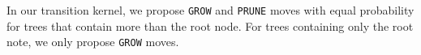 In our transition kernel, we propose \texttt{GROW} and \texttt{PRUNE} moves with equal probability for trees that contain more than the root node.
For trees containing only the root note, we only propose \texttt{GROW} moves.


\begin{comment}
\textbf{\texttt{GROW} transitions}. Suppose first that $T^{\star}$ is constructed from $T$ using a \texttt{GROW} move.
In order to construct $T^{\star},$ we must randomly select (i) a leaf node $\texttt{nx}$ in $T$ and (ii) a new decision rule $(v(\texttt{nx}), c(\texttt{nx})).$
In $T^{\star},$ the node $\texttt{nx}$ has two children (\texttt{nxl} and \texttt{nxr}) but no grandchildren. 
\end{comment}

